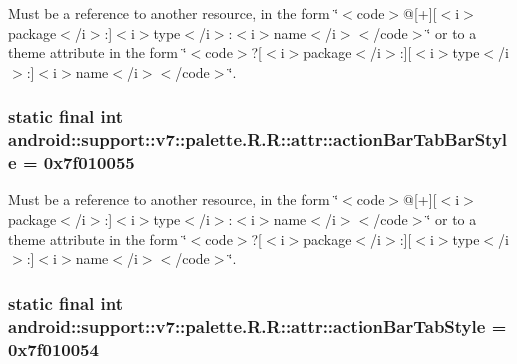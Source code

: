 Must be a reference to another resource, in the form \char`\"{}$<$code$>$@\mbox{[}+\mbox{]}\mbox{[}$<$i$>$package$<$/i$>$:\mbox{]}$<$i$>$type$<$/i$>$:$<$i$>$name$<$/i$>$$<$/code$>$\char`\"{} or to a theme attribute in the form \char`\"{}$<$code$>$?\mbox{[}$<$i$>$package$<$/i$>$:\mbox{]}\mbox{[}$<$i$>$type$<$/i$>$:\mbox{]}$<$i$>$name$<$/i$>$$<$/code$>$\char`\"{}. \hypertarget{classandroid_1_1support_1_1v7_1_1palette_1_1_r_1_1attr_fe78107ea30149c0271dfe15fd4dd212}{
\subsubsection[{actionBarTabBarStyle}]{\setlength{\rightskip}{0pt plus 5cm}static final int android::support::v7::palette.R.R::attr::actionBarTabBarStyle = 0x7f010055}}
\label{classandroid_1_1support_1_1v7_1_1palette_1_1_r_1_1attr_fe78107ea30149c0271dfe15fd4dd212}


Must be a reference to another resource, in the form \char`\"{}$<$code$>$@\mbox{[}+\mbox{]}\mbox{[}$<$i$>$package$<$/i$>$:\mbox{]}$<$i$>$type$<$/i$>$:$<$i$>$name$<$/i$>$$<$/code$>$\char`\"{} or to a theme attribute in the form \char`\"{}$<$code$>$?\mbox{[}$<$i$>$package$<$/i$>$:\mbox{]}\mbox{[}$<$i$>$type$<$/i$>$:\mbox{]}$<$i$>$name$<$/i$>$$<$/code$>$\char`\"{}. \hypertarget{classandroid_1_1support_1_1v7_1_1palette_1_1_r_1_1attr_8f79fc625bf21b15372f7a2eea8116f9}{
\subsubsection[{actionBarTabStyle}]{\setlength{\rightskip}{0pt plus 5cm}static final int android::support::v7::palette.R.R::attr::actionBarTabStyle = 0x7f010054}}
\label{classandroid_1_1support_1_1v7_1_1palette_1_1_r_1_1attr_8f79fc625bf21b15372f7a2eea8116f9}


